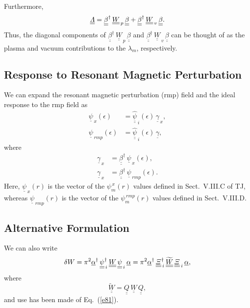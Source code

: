 \documentclass[12pt,prb,aps,notitlepage]{revtex4-1}
\begin{document}
 Furthermore,
\begin{equation}
\underline{\underline{{\mit\Lambda}}}=\underline{\underline{\beta}}^\dag\,\underline{\underline{W}}_{\,p}\,\underline{\underline{\beta}}
+\underline{\underline{\beta}}^\dag\,\underline{\underline{W}}_{\,v}\,\underline{\underline{\beta}}.
\end{equation}
Thus, the diagonal components of $\underline{\underline{\beta}}^\dag\,\underline{\underline{W}}_{\,p}\,\underline{\underline{\beta}}$ and 
$\underline{\underline{\beta}}^\dag\,\underline{\underline{W}}_{\,v}\,\underline{\underline{\beta}}$ can be thought of as the
plasma and vacuum contributions to the $\lambda_m$, respectively. 

\subsection{Response to Resonant Magnetic Perturbation}
We can expand the resonant magnetic perturbation (rmp) field and the ideal response to the rmp field as
\begin{align}
\underline{\psi}_{\,x}(\epsilon) &=\underline{\underline{\hat{\psi}}}_{\,i}(\epsilon)\,\underline{\gamma}_{\,x},\\[0.5ex]
\underline{\psi}_{\,rmp}(\epsilon) &=\underline{\underline{\hat{\psi}}}_{\,i}(\epsilon)\,\underline{\gamma},
\end{align}
where 
\begin{align}
\underline{\gamma}_{\,x}&= \underline{\underline{\beta}}^\dag\,\underline{\psi}_{\,x}(\epsilon),\\[0.5ex]
\underline{\gamma}_{\,x}&= \underline{\underline{\beta}}^\dag\,\underline{\psi}_{\,rmp}(\epsilon).
\end{align}
Here, $\underline{\psi}_{\,x}(r)$ is the vector of the $\psi^{\,x}_m(r)$ values defined in Sect.~V.III.C of TJ, whereas 
$\underline{\psi}_{\,rmp}(r)$ is the vector of the $\psi^{\,rmp}_m(r)$ values defined in Sect.~V.III.D. 

\subsection{Alternative Formulation}
We can also write
\begin{equation}
\delta W = \pi^2  \underline{\alpha}^\dag\,\underline{\underline{\psi}}^{\dag}_{\,i}\,\underline{\underline{W}}\,\underline{\underline{\psi}}_{\,i}\,\underline{\alpha}
  =\pi^2 \underline{\alpha}^\dag\,\underline{\underline{\mit\Xi}}^{\dag}_{\,i}\,\underline{\underline{\widetilde{W}}}\,\underline{\underline{\mit\Xi}}_{\,i}\,\underline{\alpha},
\end{equation}
where
\begin{equation}
\underline{\underline{\widetilde{W}}}= \underline{\underline{Q}}\,\underline{\underline{W}}\,\underline{\underline{Q}},
\end{equation}
and use has been made of Eq.~(\ref{e81}). 
\end{document}
